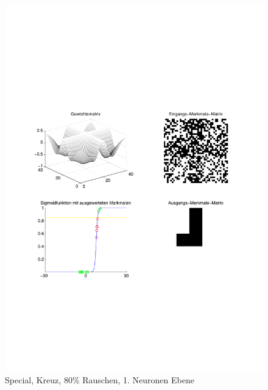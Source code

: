 \begin{figure}[hbt]
	\begin{minipage}{0.8 \textwidth}
		\includegraphics[width=\textwidth]{./Bilder/Auswertung/Endergebnis/TypeSpecial_Rauschen80_Cross_Layer1}
		\caption{Special, Kreuz, 80\% Rauschen, 1. Neuronen Ebene}
		\label{Special_Kreuz_80_1}
	\end{minipage}
	\vfill
	\begin{minipage}{0.8 \textwidth}

\end{minipage}
\end{figure}
